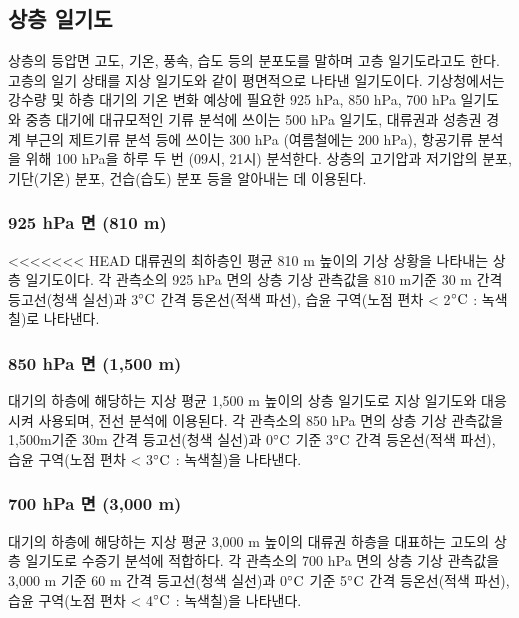 \newpage
\subsection{상층 일기도}

상층의 등압면 고도, 기온, 풍속, 습도 등의 분포도를 말하며 고층 일기도라고도 한다. 고층의 일기 상태를 지상 일기도와 같이 평면적으로 나타낸 일기도이다. 기상청에서는 강수량 및 하층 대기의 기온 변화 예상에 필요한 925 hPa, 850 hPa, 700 hPa 일기도와 중층 대기에 대규모적인 기류 분석에 쓰이는 500 hPa 일기도, 대류권과 성층권 경계 부근의 제트기류 분석 등에 쓰이는 300 hPa (여름철에는 200 hPa), 항공기류 분석을 위해 100 hPa을 하루 두 번 (09시, 21시) 분석한다. 상층의 고기압과 저기압의 분포, 기단(기온) 분포, 건습(습도) 분포 등을 알아내는 데 이용된다.

\subsubsection{925 hPa 면 (810 m)}
<<<<<<< HEAD
대류권의 최하층인 평균 810 m 높이의 기상 상황을 나타내는 상층 일기도이다. 각 관측소의 925 hPa 면의 상층 기상 관측값을 810 m기준 30 m 간격 등고선(청색 실선)과 3$\rm ^{\circ}C$ 간격 등온선(적색 파선), 습윤 구역(노점 편차 < 2$\rm ^{\circ}C$ : 녹색 칠)로 나타낸다. 

\subsubsection{850 hPa 면 (1,500 m)}
대기의 하층에 해당하는 지상 평균 1,500 m 높이의 상층 일기도로 지상 일기도와 대응시켜 사용되며, 전선 분석에 이용된다. 각 관측소의 850 hPa 면의 상층 기상 관측값을 1,500m기준 30m 간격 등고선(청색 실선)과 0$\rm ^{\circ}C$ 기준 3$\rm ^{\circ}C$ 간격 등온선(적색 파선), 습윤 구역(노점 편차 < 3$\rm ^{\circ}C$ : 녹색칠)을 나타낸다.

\subsubsection{700 hPa 면 (3,000 m)}
대기의 하층에 해당하는 지상 평균 3,000 m 높이의 대류권 하층을 대표하는 고도의 상층 일기도로 수증기 분석에 적합하다. 각 관측소의 700 hPa 면의 상층 기상 관측값을 3,000 m 기준 60 m 간격 등고선(청색 실선)과 0$\rm ^{\circ}C$  기준 5$\rm ^{\circ}C$  간격 등온선(적색 파선), 습윤 구역(노점 편차 < 4$\rm ^{\circ}C$ : 녹색칠)을 나타낸다. 

